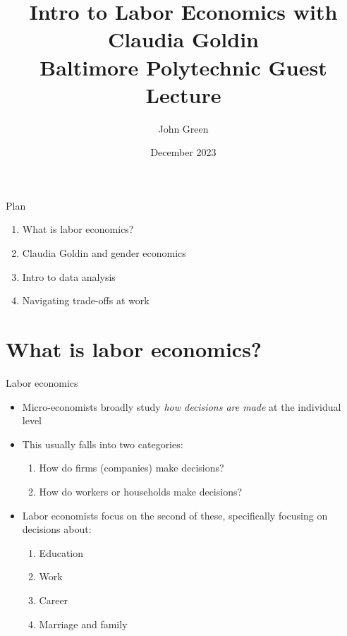 \documentclass[aspectratio=169]{beamer}
\title{Intro to Labor Economics with Claudia Goldin \\ \vspace{2mm} \large Baltimore Polytechnic Guest Lecture}
\author{John Green}
\institute{\normalsize Johns Hopkins Economics} %
\date{December 2023}
\begin{document}
\begin{frame}
    \titlepage 
\end{frame}

\begin{frame}{Plan}

\begin{enumerate}
    \item What is labor economics? 
    \item Claudia Goldin and gender economics
    \item Intro to data analysis
    \item Navigating trade-offs at work
\end{enumerate}

\end{frame}

\section{What is labor economics?}

\begin{frame}{Labor economics}
    \begin{itemize}
        \item Micro-economists broadly study \textit{how decisions are made} at the individual level
        \item This usually falls into two categories:
        \begin{enumerate}
            \item How do firms (companies) make decisions?
            \item How do workers or households make decisions?
        \end{enumerate}
        \item Labor economists focus on the second of these, specifically focusing on decisions about:
        \begin{enumerate}
            \item Education
            \item Work
            \item Career
            \item Marriage and family
        \end{enumerate}
    \end{itemize}
\end{frame}
\end{document}
